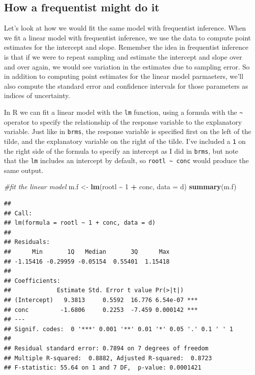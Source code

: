 \documentclass[
]{book}
\newenvironment{Shaded}{\begin{snugshade}}{\end{snugshade}}
\newcommand{\AttributeTok}[1]{\textcolor[rgb]{0.13,0.29,0.53}{#1}}
\newcommand{\CommentTok}[1]{\textcolor[rgb]{0.56,0.35,0.01}{\textit{#1}}}
\newcommand{\DecValTok}[1]{\textcolor[rgb]{0.00,0.00,0.81}{#1}}
\newcommand{\FunctionTok}[1]{\textcolor[rgb]{0.13,0.29,0.53}{\textbf{#1}}}
\newcommand{\NormalTok}[1]{#1}
\newcommand{\OtherTok}[1]{\textcolor[rgb]{0.56,0.35,0.01}{#1}}
\newcommand{\SpecialCharTok}[1]{\textcolor[rgb]{0.81,0.36,0.00}{\textbf{#1}}}
\begin{document}
\subsection{How a frequentist might do it}\label{how-a-frequentist-might-do-it}

Let's look at how we would fit the same model with frequentist inference. When we fit a linear model with frequentist inference, we use the data to compute point estimates for the intercept and slope. Remember the idea in frequentist inference is that if we were to repeat sampling and estimate the intercept and slope over and over again, we would see variation in the estimates due to sampling error. So in addition to computing point estimates for the linear model parmaeters, we'll also compute the standard error and confidence intervals for those parameters as indices of uncertainty.

In R we can fit a linear model with the \texttt{lm} function, using a formula with the \texttt{\textasciitilde{}} operator to specify the relationship of the response variable to the explanatory variable. Just like in \texttt{brms}, the response variable is specified first on the left of the tilde, and the explanatory variable on the right of the tilde. I've included a \texttt{1} on the right side of the formula to specify an intercept as I did in \texttt{brms}, but note that the \texttt{lm} includes an intercept by default, so \texttt{rootl\ \textasciitilde{}\ conc} would produce the same output.

\begin{Shaded}
\begin{Highlighting}[]
\CommentTok{\#fit the linear model}
\NormalTok{m.f }\OtherTok{\textless{}{-}} \FunctionTok{lm}\NormalTok{(rootl }\SpecialCharTok{\textasciitilde{}} \DecValTok{1} \SpecialCharTok{+}\NormalTok{ conc, }\AttributeTok{data =}\NormalTok{ d)}
\FunctionTok{summary}\NormalTok{(m.f)}
\end{Highlighting}
\end{Shaded}

\begin{verbatim}
## 
## Call:
## lm(formula = rootl ~ 1 + conc, data = d)
## 
## Residuals:
##      Min       1Q   Median       3Q      Max 
## -1.15416 -0.29959 -0.05154  0.55401  1.15418 
## 
## Coefficients:
##             Estimate Std. Error t value Pr(>|t|)    
## (Intercept)   9.3813     0.5592  16.776 6.54e-07 ***
## conc         -1.6806     0.2253  -7.459 0.000142 ***
## ---
## Signif. codes:  0 '***' 0.001 '**' 0.01 '*' 0.05 '.' 0.1 ' ' 1
## 
## Residual standard error: 0.7894 on 7 degrees of freedom
## Multiple R-squared:  0.8882, Adjusted R-squared:  0.8723 
## F-statistic: 55.64 on 1 and 7 DF,  p-value: 0.0001421
\end{verbatim}
\end{document}
